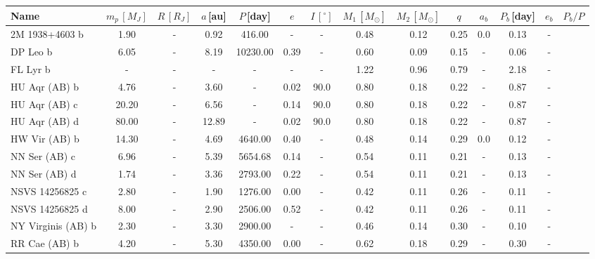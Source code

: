 \documentclass[ twoside,openright,titlepage,numbers=noenddot,headinclude,%
                footinclude=true,cleardoublepage=empty,abstractoff, %
                BCOR=5mm,paper=a4,fontsize=11pt,%
                american,%
                ]{scrreprt}
\begin{document}
\begin{table}
\centering
\begin{tabular}{lccccccccccccc}
\toprule
    Name & $m_p\,[M_J]$ & $R\,[R_J]$ & $a\,$[au] &$P\,$[day] & $e$ & $I\,[^{\circ}]$ &  $M_1\,[M_\odot]$ &$M_2\,[M_\odot]$ &$q$ &  $a_b$ &   $P_b\,$[day] &  $e_b$ &  $P_b/P$\\
\midrule
2M 1938+4603 b     &   1.90 & - &   0.92 &    416.00 &   - &   - &    0.48 &    0.12 &  0.25 &       0.0 &      0.13 &       - \\
    DP Leo b           &   6.05 & - &   8.19 &  10230.00 &  0.39 &   - &    0.60 &    0.09 &  0.15 &       - &      0.06 &       - \\
    FL Lyr b           &    - & - &    - &       - &   - &   - &    1.22 &    0.96 &  0.79 &       - &      2.18 &       - \\
    HU Aqr (AB) b      &   4.76 & - &   3.60 &       - &  0.02 &  90.0 &    0.80 &    0.18 &  0.22 &       - &      0.87 &       - \\
    HU Aqr (AB) c      &  20.20 & - &   6.56 &       - &  0.14 &  90.0 &    0.80 &    0.18 &  0.22 &       - &      0.87 &       - \\
    HU Aqr (AB) d      &  80.00 & - &  12.89 &       - &  0.02 &  90.0 &    0.80 &    0.18 &  0.22 &       - &      0.87 &       - \\
    HW Vir (AB) b      &  14.30 & - &   4.69 &   4640.00 &  0.40 &   - &    0.48 &    0.14 &  0.29 &       0.0 &      0.12 &       - \\
    NN Ser (AB) c      &   6.96 & - &   5.39 &   5654.68 &  0.14 &   - &    0.54 &    0.11 &  0.21 &       - &      0.13 &       - \\
    NN Ser (AB) d      &   1.74 & - &   3.36 &   2793.00 &  0.22 &   - &    0.54 &    0.11 &  0.21 &       - &      0.13 &       - \\
    NSVS 14256825 c    &   2.80 & - &   1.90 &   1276.00 &  0.00 &   - &    0.42 &    0.11 &  0.26 &       - &      0.11 &       - \\
    NSVS 14256825 d    &   8.00 & - &   2.90 &   2506.00 &  0.52 &   - &    0.42 &    0.11 &  0.26 &       - &      0.11 &       - \\
    NY Virginis (AB) b &   2.30 & - &   3.30 &   2900.00 &   - &   - &    0.46 &    0.14 &  0.30 &       - &      0.10 &       - \\
    RR Cae (AB) b      &   4.20 & - &   5.30 &   4350.00 &  0.00 &   - &    0.62 &    0.18 &  0.29 &       - &      0.30 &       - \\

\end{tabular}
\end{table}
\end{document}
